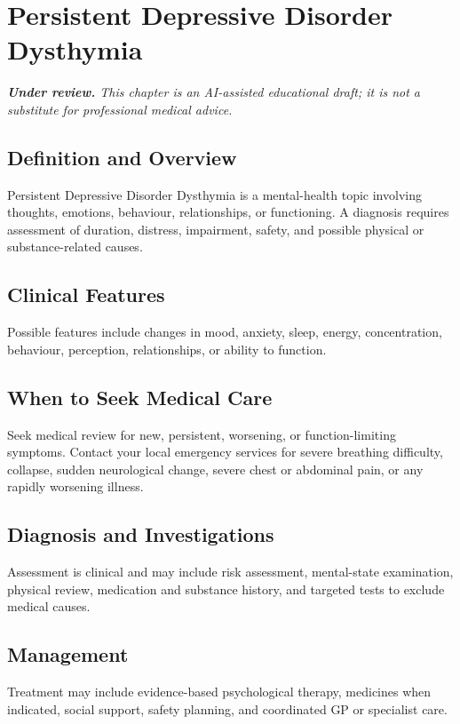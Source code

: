 \chapter{Persistent Depressive Disorder Dysthymia}

\medskip
\noindent\textit{\textbf{Under review.} This chapter is an AI-assisted educational draft; it is not a substitute for professional medical advice.}

\section*{Definition and Overview}
Persistent Depressive Disorder Dysthymia is a mental-health topic involving thoughts, emotions, behaviour, relationships, or functioning. A diagnosis requires assessment of duration, distress, impairment, safety, and possible physical or substance-related causes.

\section*{Clinical Features}
Possible features include changes in mood, anxiety, sleep, energy, concentration, behaviour, perception, relationships, or ability to function.

\section*{When to Seek Medical Care}
Seek medical review for new, persistent, worsening, or function-limiting symptoms. Contact your local emergency services for severe breathing difficulty, collapse, sudden neurological change, severe chest or abdominal pain, or any rapidly worsening illness.

\section*{Diagnosis and Investigations}
Assessment is clinical and may include risk assessment, mental-state examination, physical review, medication and substance history, and targeted tests to exclude medical causes.

\section*{Management}
Treatment may include evidence-based psychological therapy, medicines when indicated, social support, safety planning, and coordinated GP or specialist care.

